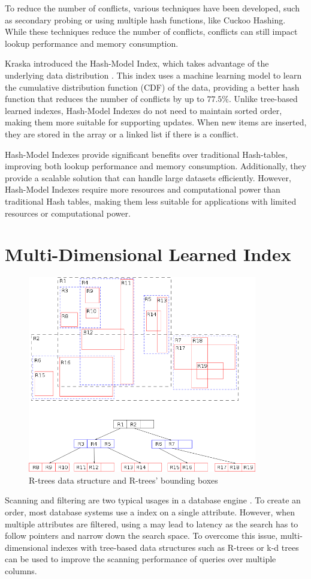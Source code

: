 To reduce the number of conflicts, various techniques have been developed, such as secondary probing or using multiple hash functions, like Cuckoo Hashing. While these techniques reduce the number of conflicts, conflicts can still impact lookup performance and memory consumption.

Kraska introduced the Hash-Model Index, which takes advantage of the underlying data distribution \cite{CasedLearnedIndex}. This index uses a machine learning model to learn the cumulative distribution function (CDF) of the data, providing a better hash function that reduces the number of conflicts by up to $77.5\%$. Unlike tree-based learned indexes, Hash-Model Indexes do not need to maintain sorted order, making them more suitable for supporting updates. When new items are inserted, they are stored in the array or a linked list if there is a conflict.

Hash-Model Indexes provide significant benefits over traditional Hash-tables, improving both lookup performance and memory consumption. Additionally, they provide a scalable solution that can handle large datasets efficiently. However, Hash-Model Indexes require more resources and computational power than traditional Hash tables, making them less suitable for applications with limited resources or computational power. 

\section{Multi-Dimensional Learned Index}
\begin{figure}
    \centering
    \includegraphics[width=100mm,scale=1]{Figures/R-tree.png}
    \caption{
        R-trees data structure and R-trees' bounding boxes 
    }
    \label{fig:R-tree}
\end{figure}
Scanning and filtering are two typical usages in a database engine \cite{FloodLMD}. To create an order, most database systems use a \btree index on a single attribute. However, when multiple attributes are filtered, using a \btree may lead to latency as the search has to follow pointers and narrow down the search space. To overcome this issue, multi-dimensional indexes with tree-based data structures such as R-trees \cite{r-tree} or k-d trees \cite{kdtree} can be used to improve the scanning performance of queries over multiple columns.

